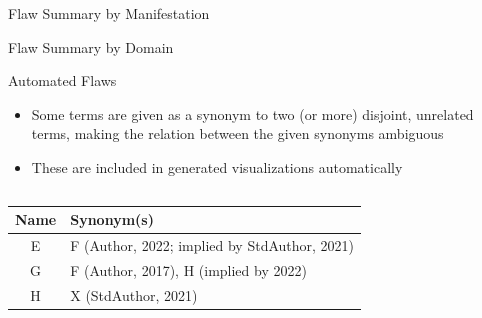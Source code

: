 \begin{frame}{Flaw Summary by Manifestation}
    \begin{center}
        
    \end{center}
\end{frame}

\begin{frame}{Flaw Summary by Domain}
    \begin{center}
        
    \end{center}
\end{frame}

\begin{frame}{Automated Flaws}
    \begin{itemize}
        \item Some terms are given as a synonym to two (or more) disjoint,
              unrelated terms, making the relation between the given synonyms
              ambiguous \pause
        \item These are included in generated visualizations automatically
    \end{itemize}
    \vspace{-0.5cm}
    \begin{columns}[c]
        \begin{column}{.475\linewidth}
            \small
            \begin{table}[hbtp!]
                \centering
                \begin{tabularx}{\textwidth}{c>{\raggedleft\arraybackslash}X} \hline
                    Name & Synonym(s)                                   \\ \hline
                    E    & F (Author, 2022; implied by StdAuthor, 2021) \\
                    G    & F (Author, 2017), H (implied by 2022)        \\
                    H    & X (StdAuthor, 2021)                          \\ \hline
                \end{tabularx}
            \end{table}
        \end{column}
        \begin{column}{.5\linewidth}

\end{column}
\end{columns}
\end{frame}
